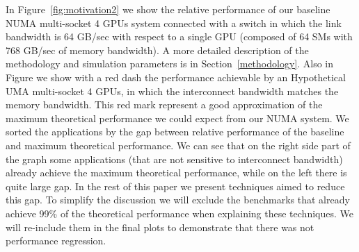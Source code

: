 In Figure~\ref{fig:motivation2} we show the relative performance of our 
baseline NUMA multi-socket 4 GPUs system connected with a switch in which the 
link bandwidth is 64 GB/sec with respect to a single GPU (composed of 64 SMs 
with 768 GB/sec of memory bandwidth). A more detailed description of the 
methodology and simulation parameters is in Section~\ref{methodology}. Also 
in Figure we show with a red dash the performance achievable by an 
Hypothetical UMA multi-socket 4 GPUs, in which the interconnect bandwidth 
matches the memory bandwidth. This red mark represent a good approximation of 
the maximum theoretical performance we could expect from our NUMA system. We 
sorted the applications by the gap between relative performance of the 
baseline and maximum theoretical performance. We can see that on the right 
side part of the graph some applications (that are not sensitive to 
interconnect bandwidth) already achieve the maximum theoretical performance, 
while on the left there is quite large gap. In the rest of this paper we 
present techniques aimed to reduce this gap. To simplify the discussion we 
will exclude the benchmarks that already achieve 99\% of the theoretical 
performance when explaining these techniques. We will re-include them in the 
final plots to demonstrate that there was not performance regression. 








